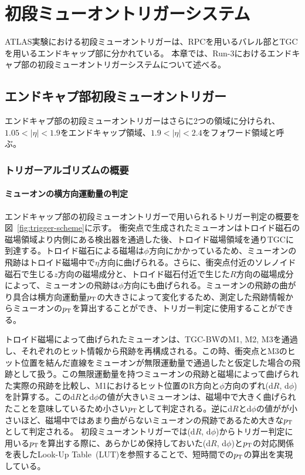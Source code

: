 \chapter{初段ミューオントリガーシステム}\label{chapter3}
ATLAS実験における初段ミューオントリガーは、RPCを用いるバレル部とTGCを用いるエンドキャップ部に分かれている。
本章では、Run-3におけるエンドキャプ部の初段ミューオントリガーシステムについて述べる。

\section{エンドキャプ部初段ミューオントリガー}
エンドキャプ部の初段ミューオントリガーはさらに2つの領域に分けられ、$1.05 < |\eta| < 1.9$をエンドキャップ領域、$1.9 < |\eta| < 2.4$をフォワード領域と呼ぶ。

\subsection{トリガーアルゴリズムの概要}\label{section:CW}

\subsubsection{ミューオンの横方向運動量の判定}
エンドキャップ部の初段ミューオントリガーで用いられるトリガー判定の概要を図~\ref{fig:trigger-scheme}に示す。
衝突点で生成されたミューオンはトロイド磁石の磁場領域より内側にある検出器を通過した後、トロイド磁場領域を通りTGCに到達する。トロイド磁石による磁場は$\phi$方向にかかっているため、ミューオンの飛跡はトロイド磁場中で$\eta$方向に曲げられる。さらに、衝突点付近のソレノイド磁石で生じる$z$方向の磁場成分と、トロイド磁石付近で生じた$R$方向の磁場成分によって、ミューオンの飛跡は$\phi$方向にも曲げられる。ミューオンの飛跡の曲がり具合は横方向運動量$p_{\rm{T}}$の大きさによって変化するため、測定した飛跡情報からミューオンの$p_{\rm{T}}$を算出することができ、トリガー判定に使用することができる。

トロイド磁場によって曲げられたミューオンは、TGC-BWのM1, M2, M3を通過し、それぞれのヒット情報から飛跡を再構成される。この時、衝突点とM3のヒット位置を結んだ直線をミューオンが無限運動量で通過したと仮定した場合の飛跡として扱う。この無限運動量を持つミューオンの飛跡と磁場によって曲げられた実際の飛跡を比較し、M1におけるヒット位置のR方向と$\phi$方向のずれ(d$R$, d$\phi$)を計算する。このd$R$とd$\phi$の値が大きいミューオンは、磁場中で大きく曲げられたことを意味しているため小さい$p_{\rm{T}}$として判定される。逆にd$R$とd$\phi$の値がが小さいほど、磁場中ではあまり曲がらないミューオンの飛跡であるため大きな$p_{\rm{T}}$として判定される。
初段ミューオントリガーでは(d$R$, d$\phi$)からトリガー判定に用いる$p_{\rm{T}}$を算出する際に、あらかじめ保持しておいた(d$R$, d$\phi$)と$p_{\rm{T}}$の対応関係を表したLook-Up Table~(LUT)を参照することで、短時間での$p_{\rm{T}}$の算出を実現している。

